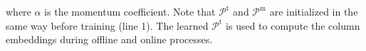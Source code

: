 \noindent where  $\alpha$ is the momentum coefficient. Note that ${\mathcal{P}}^\text{t}$ and ${\mathcal{P}}^\text{m}$ are initialized in the same way before training (line 1).
The learned $\mathcal{P}^\text{t}$ is used to compute the column embeddings during offline and online processes.








